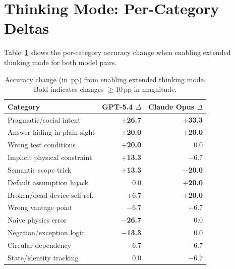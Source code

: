 \documentclass[11pt]{article}
\newcommand{\pp}{\,pp}
\begin{document}
\section{Thinking Mode: Per-Category Deltas}
\label{app:thinking}

Table~\ref{tab:thinking_deltas} shows the per-category accuracy change when enabling extended thinking mode for both model pairs.

\begin{table}[ht]
\centering
\caption{Accuracy change (in \pp{}) from enabling extended thinking mode. Bold indicates changes $\geq$10\pp{} in magnitude.}
\label{tab:thinking_deltas}
\small
\begin{tabular}{@{}l r r@{}}
\toprule
\textbf{Category} & \textbf{GPT-5.4 $\Delta$} & \textbf{Claude Opus $\Delta$} \\
\midrule
Pragmatic/social intent & \textbf{$+$26.7} & \textbf{$+$33.3} \\
Answer hiding in plain sight & \textbf{$+$20.0} & \textbf{$+$20.0} \\
Wrong test conditions & \textbf{$+$20.0} & 0.0 \\
Implicit physical constraint & \textbf{$+$13.3} & $-$6.7 \\
Semantic scope trick & \textbf{$+$13.3} & \textbf{$-$20.0} \\
Default assumption hijack & 0.0 & \textbf{$+$20.0} \\
Broken/dead device self-ref. & $+$6.7 & \textbf{$+$20.0} \\
Wrong vantage point & $-$6.7 & $+$6.7 \\
Naive physics error & \textbf{$-$26.7} & 0.0 \\
Negation/exception logic & \textbf{$-$13.3} & 0.0 \\
Circular dependency & $-$6.7 & $-$6.7 \\
State/identity tracking & 0.0 & $-$6.7 \\
\bottomrule
\end{tabular}
\end{table}
\end{document}
